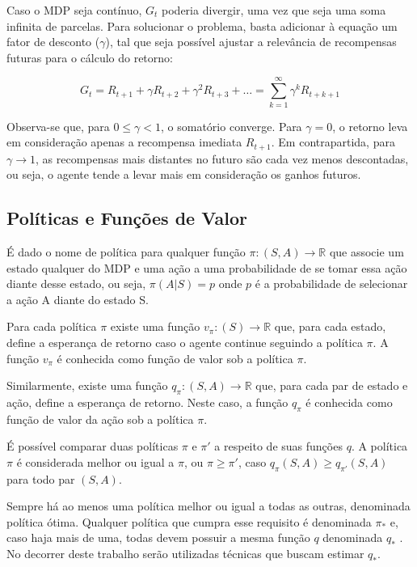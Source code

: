 Caso o MDP seja contínuo, $G_t$ poderia divergir, uma vez que seja uma soma infinita de parcelas. Para solucionar o problema, basta adicionar à equação um fator de desconto ($\gamma$), tal que seja possível ajustar a relevância de recompensas futuras para o cálculo do retorno:

\begin{equation}
	G_{t} = R_{t+1} + \gamma R_{t+2} + \gamma^2 R_{t+3} + \dotsc = \sum_{k=1}^{\infty} \gamma^k R_{t+k+1}
\end{equation}

Observa-se que, para $ 0 \leq \gamma < 1$, o somatório converge. Para $\gamma = 0$, o retorno leva em consideração apenas a recompensa imediata $R_{t+1}$. Em contrapartida, para $\gamma \to 1$, as recompensas mais distantes no futuro são cada vez menos descontadas, ou seja, o agente tende a levar mais em consideração os ganhos futuros.

\subsection{Políticas e Funções de Valor}

É dado o nome de política para qualquer função $\pi: (S, A) \to \mathbb{R}$ que associe um estado qualquer do MDP e uma ação a uma probabilidade de se tomar essa ação diante desse estado, ou seja, $\pi(A|S) = p$ onde $p$ é a probabilidade de selecionar a ação A diante do estado S.

Para cada política $\pi$ existe uma função $v_\pi: (S) \to \mathbb{R}$ que, para cada estado, define a esperança de retorno caso o agente continue seguindo a política $\pi$. A função $v_\pi$ é conhecida como função de valor sob a política $\pi$.

Similarmente, existe uma função $q_\pi: (S, A) \to \mathbb{R}$ que, para cada par de estado e ação, define a esperança de retorno. Neste caso, a função $q_\pi$ é conhecida como função de valor da ação sob a política $\pi$.

É possível comparar duas políticas $\pi$ e $\pi'$ a respeito de suas funções $q$. A política $\pi$ é considerada melhor ou igual a $\pi$, ou $\pi \ge \pi'$, caso $q_\pi(S, A) \ge q_{\pi'}(S, A)$ para todo par $(S, A)$.

Sempre há ao menos uma política melhor ou igual a todas as outras, denominada política ótima. Qualquer política que cumpra esse requisito é denominada $\pi_*$ e, caso haja mais de uma, todas devem possuir a mesma função $q$ denominada $q_*$ \cite{sutton2018reinforcement}. No decorrer deste trabalho serão utilizadas técnicas que buscam estimar $q_*$. %

